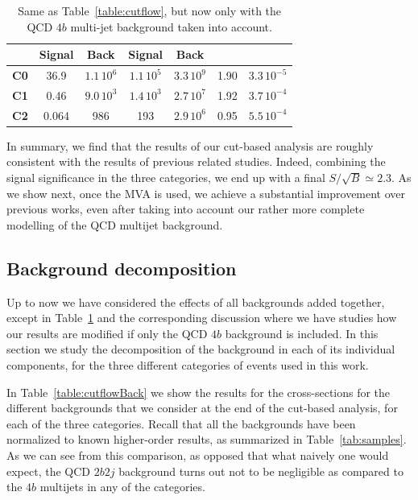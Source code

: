 \begin{table}[t]
\begin{tabular}{c|c|c|c|c|c|c}
      &    Signal & Back   &  Signal  & Back
    &   & \\
    \hline
 {\bf C0}  &  36.9  & $1.1\,10^{6}$ & $1.1\,10^5$ & $3.3\,10^{9}$  &  1.90 & $3.3\,10^{-5}$\\
        {\bf C1}  &  0.46    & $9.0\,10^3$    &  $1.4\,10^3$   & $2.7\,10^7$     & 1.92     &  $3.7\,10^{-4}$ \\
        {\bf C2}  &  0.064     &  986     &  193   &  $2.9\,10^6$    &  0.95  &  $5.5\,10^{-4}$ \\
        \hline
  \end{tabular}
  \caption{\small Same as Table~\ref{table:cutflow}, but now
    only with the QCD $4b$ multi-jet background taken into account.
    \label{table:cutflow4B}
  }
\end{table}


In summary, we find that the results of our cut-based analysis are roughly
consistent with the results of previous related studies.
%
Indeed, combining the signal significance in the three categories, we end
up with a final $S/\sqrt{B}\simeq 2.3$.
%
As we show next, once the MVA is used, we achieve a substantial
improvement
over previous works, even after taking into account our rather more
complete modelling of the QCD multijet background.




\subsection{Background decomposition}

Up to now we have considered the effects of all backgrounds added
together, except in Table~\ref{table:cutflow4B} and the corresponding
discussion where we have studies how our
results are modified if only the QCD $4b$ background is included.
%
In this section we study the decomposition of the background in each
of its individual components, for the three different categories
of events used in this work.
%

In Table~\ref{table:cutflowBack}   we show the results for the cross-sections for the different
backgrounds that we consider at the end of the cut-based analysis, for each
of the three categories.
%
Recall that all the backgrounds have been normalized to known higher-order results,
as summarized in Table~\ref{tab:samples}.
%
As we can see from this comparison, as opposed that what naively one would expect,
the QCD $2b2j$ background turns out not to be negligible as compared to the $4b$
multijets in any of the categories.

